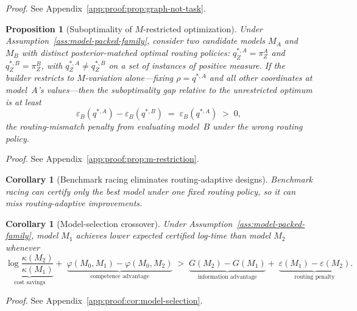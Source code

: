 \documentclass[10pt]{article}
\theoremstyle{paperplain}
\newtheorem{proposition}[theorem]{Proposition}
\newtheorem{corollary}[theorem]{Corollary}
\theoremstyle{paperdefinition}
\theoremstyle{paperremark}
\begin{document}
\par\noindent\emph{Proof.} See Appendix~\ref{app:proof:prop:graph-not-task}.\par


\begin{proposition}[Suboptimality of $M$-restricted optimization]
\label{prop:m-restriction}
Under Assumption~\ref{ass:model-packed-family}, consider two candidate models $M_A$ and $M_B$ with distinct posterior-matched optimal routing policies: $q^{*,A}_Z=\pi_Z^A$ and $q^{*,B}_Z=\pi_Z^B$, with $q^{*,A}_Z \ne q^{*,B}_Z$ on a set of instances of positive measure.
If the builder restricts to $M$-variation alone---fixing $\rho = q^{*,A}$ and all other coordinates at model~$A$'s values---then the suboptimality gap relative to the unrestricted optimum is at least
\[
\varepsilon_B(q^{*,A}) - \varepsilon_B(q^{*,B}) \;=\; \varepsilon_B(q^{*,A}) \;>\; 0,
\]
the routing-mismatch penalty from evaluating model~$B$ under the wrong routing policy.
\end{proposition}

\par\noindent\emph{Proof.} See Appendix~\ref{app:proof:prop:m-restriction}.\par


\begin{corollary}[Benchmark racing eliminates routing-adaptive designs]
\label{cor:binary-restriction}
Benchmark racing can certify only the best model under one fixed routing policy,
so it can miss routing-adaptive improvements.
\end{corollary}

\begin{corollary}[Model-selection crossover]
\label{cor:model-selection}
Under Assumption~\ref{ass:model-packed-family}, model $M_1$ achieves lower expected certified log-time than model $M_2$ whenever
\begin{equation}
\label{eq:crossover}
\underbrace{\log\frac{\kappa(M_2)}{\kappa(M_1)}}_{\text{cost savings}}
+\;
\underbrace{\varphi(M_0,M_1) - \varphi(M_0,M_2)}_{\text{competence advantage}}
\;>\;
\underbrace{G(M_2) - G(M_1)}_{\text{information advantage}}
+\;
\underbrace{\varepsilon(M_1) - \varepsilon(M_2)}_{\text{routing penalty}}.
\end{equation}
\end{corollary}

\par\noindent\emph{Proof.} See Appendix~\ref{app:proof:cor:model-selection}.\par
\end{document}
